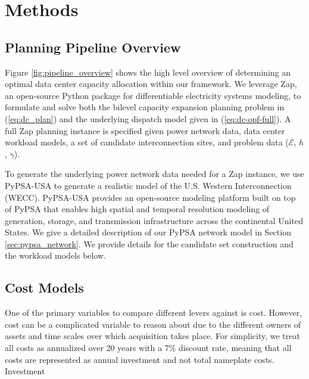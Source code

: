 \section{Methods}

\subsection{Planning Pipeline Overview}

Figure \ref{fig:pipeline_overview} shows the high level overview of determining an optimal data center capacity allocation within our framework. We leverage Zap, an open-source Python package for differentiable electricity systems modeling, to formulate and solve both the bilevel capacity expansion planning problem in (\ref{eq:dc_plan}) and the underlying dispatch model given in (\ref{eq:dc-opf-full}). A full Zap planning instance is specified given power network data, data center workload models, a set of candidate interconnection sites, and problem data ($\mathcal{E}$, $h$, $\gamma$).

To generate the underlying power network data needed for a Zap instance, we use PyPSA-USA \cite{tehranchi5029120pypsa} to generate a realistic model of the U.S. Western Interconnection (WECC). PyPSA-USA provides an open-source modeling platform built on top of PyPSA that enables high spatial and temporal resolution modeling of generation, storage, and transmission infrastructure across the continental United States. We give a detailed description of our PyPSA network model in Section \ref{sec:pypsa_network}. We provide details for the candidate set construction and the workload models below. 

\subsection{Cost Models}\label{sec:investment-cost}
One of the primary variables to compare different levers against is cost. However, cost can be a complicated variable to reason about due to the different owners of assets and time scales over which acquisition takes place. For simplicity, we treat all costs as annualized over 20 years with a 7\% discount rate, meaning that all costs are represented as annual investment and not total nameplate costs. Investment 

